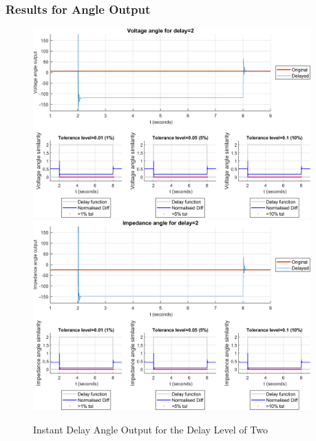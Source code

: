 \subsubsection{Results for Angle Output}


\begin{figure}
    \caption{Instant Delay Angle Output for the Delay Level of Two}
    \includegraphics[width=0.95\textwidth]{PMUsim-figures/DelayOf_2/Instant_vAngle.png}    
    \includegraphics[width=0.95\textwidth]{PMUsim-figures/DelayOf_2/Instant_iAngle.png}    
    \label{fig:PMUsim_Two_Angle}
        \begin{small}
     \end{small}
\end{figure}


